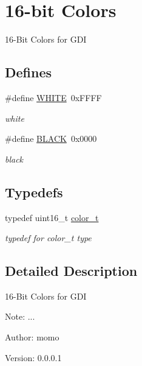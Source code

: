 \hypertarget{group__hgdi__colors16}{
\section{16-bit Colors}
\label{group__hgdi__colors16}
}
16-Bit Colors for GDI  


\subsection*{Defines}
\begin{CompactItemize}
\item 
\hypertarget{group__hgdi__colors16_g87b537f5fa5c109d3c05c13d6b18f382}{
\#define \hyperlink{group__hgdi__colors16_g87b537f5fa5c109d3c05c13d6b18f382}{WHITE}~0xFFFF}
\label{group__hgdi__colors16_g87b537f5fa5c109d3c05c13d6b18f382}

\begin{CompactList}\small\item\em white \item\end{CompactList}\item 
\hypertarget{group__hgdi__colors16_g7b3b25cba33b07c303f3060fe41887f6}{
\#define \hyperlink{group__hgdi__colors16_g7b3b25cba33b07c303f3060fe41887f6}{BLACK}~0x0000}
\label{group__hgdi__colors16_g7b3b25cba33b07c303f3060fe41887f6}

\begin{CompactList}\small\item\em black \item\end{CompactList}\end{CompactItemize}
\subsection*{Typedefs}
\begin{CompactItemize}
\item 
\hypertarget{group__hgdi__colors16_g1fb59ae1391d527c0bd119b5a95fb8a1}{
typedef uint16\_\-t \hyperlink{group__hgdi__colors16_g1fb59ae1391d527c0bd119b5a95fb8a1}{color\_\-t}}
\label{group__hgdi__colors16_g1fb59ae1391d527c0bd119b5a95fb8a1}

\begin{CompactList}\small\item\em typedef for color\_\-t type \item\end{CompactList}\end{CompactItemize}


\subsection{Detailed Description}
16-Bit Colors for GDI 

\begin{Desc}
\item[Note:]... \end{Desc}
\begin{Desc}
\item[Author:]momo \end{Desc}
\begin{Desc}
\item[Version:]0.0.0.1 \end{Desc}
